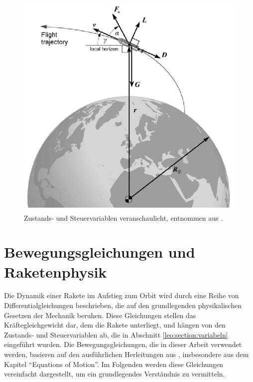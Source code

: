 \begin{figure}
	\centering
	\includegraphics[width=0.65\linewidth]{papers/leo/Grafiken/forces.png}
	\caption{Zustands- und Steuervariablen veranschaulicht, entnommen aus \cite{leo:astronautics}.}
	\label{fig:leo:forces}
\end{figure}



\section{Bewegungsgleichungen und Raketenphysik \label{leo:section:beweungsgleichungen}}

Die Dynamik einer Rakete im Aufstieg zum Orbit wird durch eine Reihe
von Differentialgleichungen beschrieben, die auf den grundlegenden
physikalischen Gesetzen der Mechanik beruhen.
Diese Gleichungen stellen das Kräftegleichgewicht dar, dem die
Rakete unterliegt, und hängen von den Zustands- und Steuervariablen
ab, die in Abschnitt \ref{leo:section:variabeln} eingeführt wurden.
Die Bewegungsgleichungen, die in dieser Arbeit verwendet werden,
basieren auf den ausführlichen Herleitungen aus \cite{leo:astronautics},
insbesondere aus dem Kapitel ``Equations of Motion''.
Im Folgenden werden diese Gleichungen vereinfacht dargestellt, um
ein grundlegendes Verständnis zu vermitteln.

